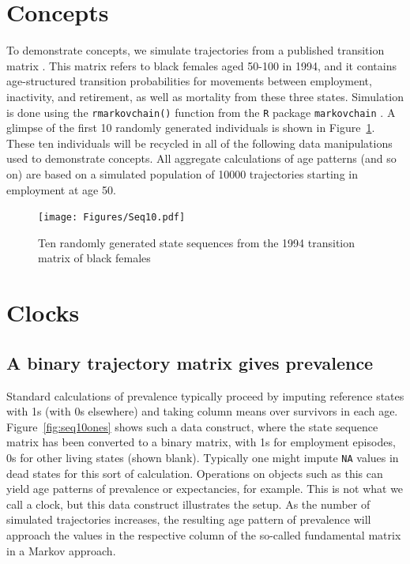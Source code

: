 \documentclass{article}
\begin{document}
\section{Concepts}
To demonstrate concepts, we simulate trajectories from a published transition matrix \citep{Dudel2017}. This matrix refers to black females aged 50-100 in 1994, and it contains age-structured transition probabilities for movements between employment, inactivity, and retirement, as well as mortality from these three states. Simulation is done using the \texttt{rmarkovchain()} function from the \texttt{R} package \texttt{markovchain} \citep{spedicato2017}. A glimpse of the first 10 randomly generated individuals is shown in Figure~\ref{fig:seq10}. These ten individuals will be recycled in all of the following data manipulations used to demonstrate concepts. All aggregate calculations of age patterns (and so on) are based on a simulated population of 10000 trajectories starting in employment at age 50.

\begin{figure}[ht!]
\centering
\caption{Ten randomly generated state sequences from the 1994 transition matrix
of black females \citep{Dudel2017}}
\label{fig:seq10}
\texttt{[image: Figures/Seq10.pdf]}
\end{figure}

\FloatBarrier

\section{Clocks}
\label{sec:clocks}

\subsection{A binary trajectory matrix gives prevalence}
Standard calculations of prevalence typically proceed by imputing reference states with 1s (with 0s elsewhere) and taking column means over survivors in each age. Figure~\ref{fig:seq10ones} shows such a data construct, where the state sequence matrix has been converted to a binary matrix, with 1s for employment episodes, 0s for other living states (shown blank). Typically one might impute \texttt{NA} values in dead states for this sort of calculation. Operations on objects such as this can yield age patterns of prevalence or expectancies, for example. This is not what we call a clock, but this data construct illustrates the setup. As the number of simulated trajectories increases, the resulting age pattern of prevalence will approach the values in the respective column of the so-called fundamental matrix in a Markov approach.
\end{document}

